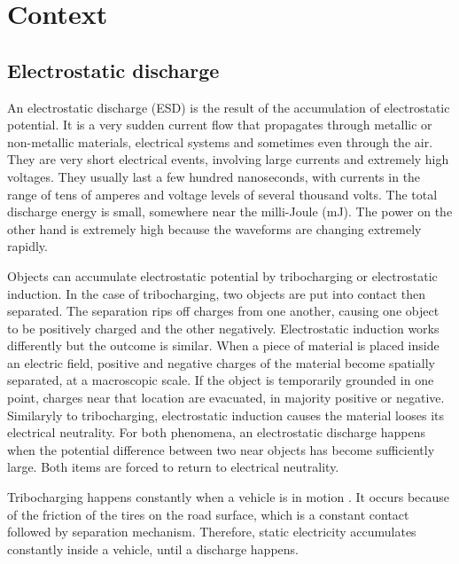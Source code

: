 \section{Context}
\subsection{Electrostatic discharge}

An electrostatic discharge (ESD) is the result of the accumulation of electrostatic potential.
It is a very sudden current flow that propagates through metallic or non-metallic materials, electrical systems and sometimes even through the air.
They are very short electrical events, involving large currents and extremely high voltages.
They usually last a few hundred nanoseconds, with currents in the range of tens of amperes and voltage levels of several thousand volts.
The total discharge energy is small, somewhere near the milli-Joule (mJ).
The power on the other hand is extremely high because the waveforms are changing extremely rapidly.

Objects can accumulate electrostatic potential by tribocharging or electrostatic induction.
In the case of tribocharging, two objects are put into contact then separated.
The separation rips off charges from one another, causing one object to be positively charged and the other negatively.
Electrostatic induction works differently but the outcome is similar.
When a piece of material is placed inside an electric field, positive and negative charges of the material become spatially separated, at a macroscopic scale.
If the object is temporarily grounded in one point, charges near that location are evacuated, in majority positive or negative.
Similaryly to tribocharging, electrostatic induction causes the material looses its electrical neutrality.
For both phenomena, an electrostatic discharge happens when the potential difference between two near objects has become sufficiently large.
Both items are forced to return to electrical neutrality.

Tribocharging happens constantly when a vehicle is in motion \cite{generationESDautomotive}.
It occurs because of the friction of the tires on the road surface, which is a constant contact followed by separation mechanism.
Therefore, static electricity accumulates constantly inside a vehicle, until a discharge happens.


